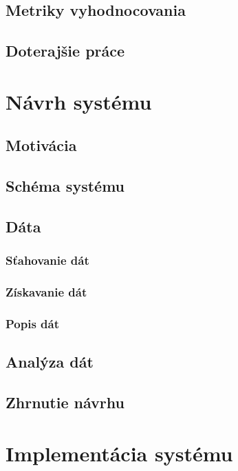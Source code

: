 \section{Metriky vyhodnocovania}


\section{Doterajšie práce}


\chapter{Návrh systému} 
\label{navrh}

\section{Motivácia}


\section{Schéma systému}


\section{Dáta}

\subsection{Sťahovanie dát}

\subsection{Získavanie dát}

\subsection{Popis dát}


\section{Analýza dát}


\section{Zhrnutie návrhu}


\chapter{Implementácia systému}
\label{implementacia}

